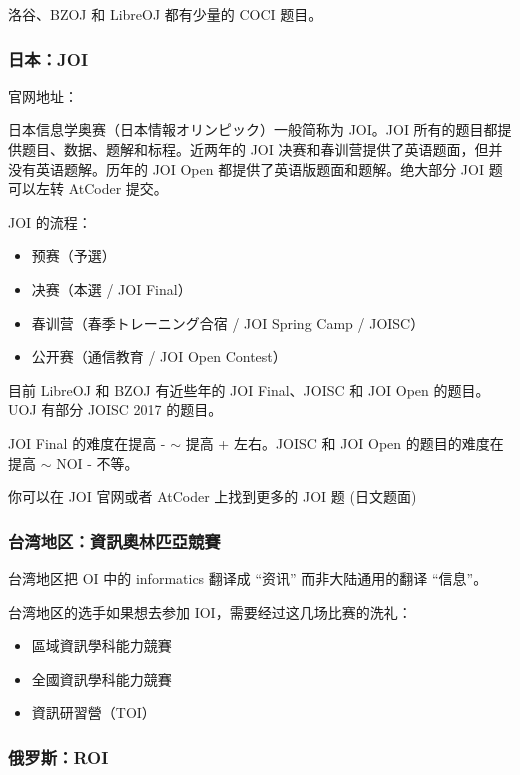 洛谷、BZOJ 和 LibreOJ 都有少量的 COCI 题目。

\subsubsection{日本：JOI}

官网地址：\href{https://www.ioi-jp.org/}{}  

日本信息学奥赛（日本情報オリンピック）一般简称为 JOI。JOI 所有的题目都提供题目、数据、题解和标程。近两年的 JOI 决赛和春训营提供了英语题面，但并没有英语题解。历年的 JOI Open 都提供了英语版题面和题解。绝大部分 JOI 题可以左转 AtCoder 提交。

JOI 的流程：

\begin{itemize}
\item 预赛（予選）
\item 决赛（本選 / JOI Final）
\item 春训营（春季トレーニング合宿 / JOI Spring Camp / JOISC）
\item 公开赛（通信教育 / JOI Open Contest）
\end{itemize}

目前 LibreOJ 和 BZOJ 有近些年的 JOI Final、JOISC 和 JOI Open 的题目。UOJ 有部分 JOISC 2017 的题目。

JOI Final 的难度在提高 - $\sim$ 提高 + 左右。JOISC 和 JOI Open 的题目的难度在提高 $\sim$ NOI - 不等。

你可以在 JOI 官网或者 AtCoder 上找到更多的 JOI 题 (日文题面)

\subsubsection{台湾地区：資訊奧林匹亞競賽}

台湾地区把 OI 中的 informatics 翻译成 “资讯” 而非大陆通用的翻译 “信息”。  

台湾地区的选手如果想去参加 IOI，需要经过这几场比赛的洗礼：  

\begin{itemize}
\item 區域資訊學科能力競賽
\item 全國資訊學科能力競賽
\item 資訊研習營（TOI）
\end{itemize}

\subsubsection{俄罗斯：ROI}

